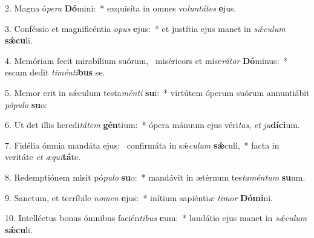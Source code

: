 2. Magna ó\textit{pe}\textit{ra} \textbf{Dó}mini:~*  exquisíta in omnes vo\textit{lun}\textit{tá}\textit{tes} \textbf{e}jus.\

3. Conféssio et magnificéntia \textit{o}\textit{pus} \textbf{e}jus:~*  et justítia ejus manet in \textit{sǽ}\textit{cu}\textit{lum} \textbf{sǽ}\textbf{cu}li.\

4. Memóriam fecit mirabílium suórum, \dag\  miséricors et mise\textit{rá}\textit{tor} \textbf{Dó}minus:~*  escam dedit \textit{ti}\textit{mén}\textit{ti}\textbf{bus} se.\

5. Memor erit in sǽculum testa\textit{mén}\textit{ti} \textbf{su}i:~*  virtútem óperum suórum annuntiábit \textit{pó}\textit{pu}\textit{lo} \textbf{su}o:\

6. Ut det illis heredi\textit{tá}\textit{tem} \textbf{gén}tium:~*  ópera mánuum ejus véri\textit{tas}, \textit{et} \textit{ju}\textbf{dí}\textbf{ci}um.\

7. Fidélia ómnia mandáta ejus: \dag\  confirmáta in sǽ\textit{cu}\textit{lum} \textbf{sǽ}culi,~*  facta in veritáte \textit{et} \textit{æ}\textit{qui}\textbf{tá}te.\

8. Redemptiónem misit pó\textit{pu}\textit{lo} \textbf{su}o:~*  mandávit in ætérnum tes\textit{ta}\textit{mén}\textit{tum} \textbf{su}um.\

9. Sanctum, et terríbile \textit{no}\textit{men} \textbf{e}jus:~*  inítium sapiénti\textit{æ} \textit{ti}\textit{mor} \textbf{Dó}\textbf{mi}ni.\

10. Intelléctus bonus ómnibus facién\textit{ti}\textit{bus} \textbf{e}um:~*  laudátio ejus manet in \textit{sǽ}\textit{cu}\textit{lum} \textbf{sǽ}\textbf{cu}li.\

